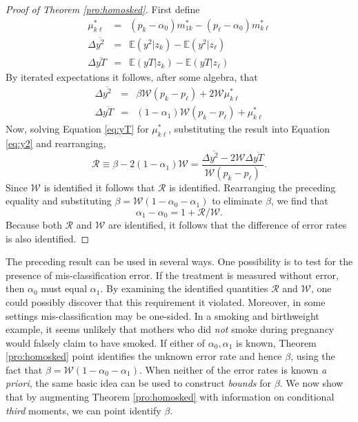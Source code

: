 \begin{proof}[Proof of Theorem \ref{pro:homosked}]
  First define
  \begin{eqnarray}
    \label{eq:mustar}
    \mu_{k\ell}^* &=&  (p_k - \alpha_0) m_{1k}^* - (p_{\ell}-\alpha_0)m_{k\ell}^* \\
    \label{eq:y2def}
    \Delta\overline{y^2} &=&  \mathbb{E}(y^2|z_k) - \mathbb{E}(y^2|z_\ell)\\
    \label{eq:yTdef}
    \Delta\overline{yT} &=&  \mathbb{E}(yT|z_k) - \mathbb{E}(yT|z_\ell)
  \end{eqnarray}
  By iterated expectations it follows, after some algebra, that
  \begin{eqnarray}
    \label{eq:y2}
    \Delta\overline{y^2} &=& \beta \mathcal{W} (p_k - p_\ell)  + 2 \mathcal{W} \mu_{k\ell}^* \\
    \label{eq:yT}
    \Delta\overline{yT} &=& (1-\alpha_1)\mathcal{W}(p_k - p_\ell) + \mu_{k\ell}^* 
  \end{eqnarray}
  Now, solving Equation \ref{eq:yT} for $\mu_{k\ell}^*$, substituting the result into Equation \ref{eq:y2} and rearranging,
  \begin{equation}
    \mathcal{R} \equiv \beta - 2(1-\alpha_1)\mathcal{W} = \frac{\Delta\overline{y^2} - 2 \mathcal{W}\Delta\overline{yT}}{\mathcal{W}(p_k - p_\ell)}.
    \label{eq:Rdef}
  \end{equation}
  Since $\mathcal{W}$ is identified it follows that $\mathcal{R}$ is identified.
  Rearranging the preceding equality and substituting $\beta=\mathcal{W}(1-\alpha_0 -\alpha_1)$ to eliminate $\beta$, we find that
  \begin{equation}
    \alpha_1 - \alpha_0 = 1 + \mathcal{R}/\mathcal{W}.
   \label{eq:aDiff}
  \end{equation}
  Because both $\mathcal{R}$ and $\mathcal{W}$ are identified, it follows that the difference of error rates is also identified.
\end{proof}

The preceding result can be used in several ways.
One possibility is to test for the presence of mis-classification error.
If the treatment is measured without error, then $\alpha_0$ must equal $\alpha_1$.
By examining the identified quantities $\mathcal{R}$ and $\mathcal{W}$, one could possibly discover that this requirement it violated.
Moreover, in some settings mis-classification may be one-sided.
In a smoking and birthweight example, it seems unlikely that mothers who did \emph{not} smoke during pregnancy would falsely claim to have smoked.
If either of $\alpha_0, \alpha_1$ is known, Theorem \ref{pro:homosked} point identifies the unknown error rate and hence $\beta$, using the fact that $\beta=\mathcal{W}(1-\alpha_0-\alpha_1)$.
When neither of the error rates is known \emph{a priori}, the same basic idea can be used to construct \emph{bounds} for $\beta$.
We now show that by augmenting Theorem \ref{pro:homosked} with information on conditional \emph{third} moments, we can point identify $\beta$.

